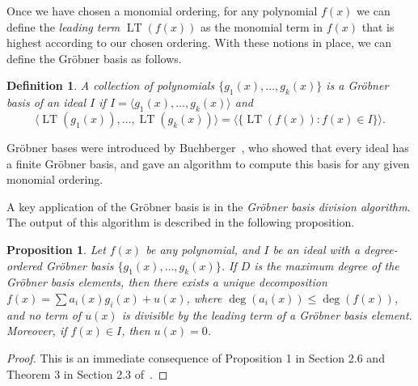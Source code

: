 \documentclass[aps,pra,notitlepage,preprintnumbers,11pt,tightenlines]{revtex4-1}
\DeclareMathOperator{\LT}{LT}
\newtheorem{definition}[theorem]{Definition}
\newtheorem{proposition}[theorem]{Proposition}
\begin{document}
Once we have chosen a monomial ordering, for any polynomial $f(x)$ we can define the
\emph{leading term} $\LT(f(x))$ as the monomial term in $f(x)$ that is
highest according to our chosen ordering. With these notions in place,
we can define the Gr\"{o}bner basis as follows.
\begin{definition}
  A collection of polynomials $\{g_1(x), \dots, g_k(x)\}$ is a
  \emph{Gr\"{o}bner basis} of an ideal $I$ if $I = \langle g_1(x), \dots,
  g_k(x) \rangle$ and 
  \[ \langle \LT(g_1(x)), \dots, \LT(g_k(x)) \rangle = \langle \{ \LT(f(x))
  : f(x) \in I \} \rangle. \]
  \label{def:groebner}
\end{definition}
Gr\"{o}bner bases were introduced by Buchberger~\cite{buchberger:70}, who showed that every ideal has a finite Gr\"{o}bner
basis, and gave an algorithm to compute this basis for any given
monomial ordering.

A key application of the Gr\"{o}bner basis is 
in the \emph{Gr\"{o}bner basis division algorithm}. The output of this
algorithm is described in the following proposition.
\begin{proposition}
  Let $f(x)$ be any polynomial, and $I$ be an ideal with a
  degree-ordered Gr\"{o}bner basis $\{g_1(x), \dots, g_k(x)\}$. If $D$ is the
  maximum degree of the Gr\"{o}bner basis elements, then there exists
  a unique decomposition $f(x) = \sum
  a_i(x) g_i(x) + u(x)$, where $\deg(a_i(x)) \leq
  \deg(f(x))$, and no term of $u(x)$ is divisible by the leading term
  of a Gr\"{o}bner basis element. Moreover, if $f(x) \in I$, then $u(x) = 0$.
  \label{prop:groebner_division}
\end{proposition}
\begin{proof}
  This is an immediate consequence of Proposition 1
  in Section 2.6 and Theorem 3 in Section 2.3 of~\cite{clo:1996}. 
\end{proof}
\end{document}
